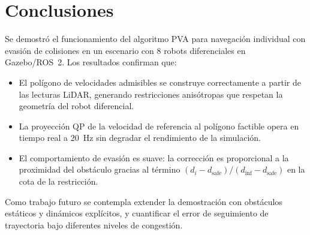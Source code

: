 \section{Conclusiones}

Se demostró el funcionamiento del algoritmo PVA para navegación individual con evasión de colisiones en un escenario con 8 robots diferenciales en Gazebo/ROS~2. Los resultados confirman que:

\begin{itemize}
  \item El polígono de velocidades admisibles se construye correctamente a partir de las lecturas LiDAR, generando restricciones anisótropas que respetan la geometría del robot diferencial.
  \item La proyección QP de la velocidad de referencia al polígono factible opera en tiempo real a 20~Hz sin degradar el rendimiento de la simulación.
  \item El comportamiento de evasión es suave: la corrección es proporcional a la proximidad del obstáculo gracias al término $(d_i - d_{\text{safe}})/(d_{\text{inf}} - d_{\text{safe}})$ en la cota de la restricción.
\end{itemize}

Como trabajo futuro se contempla extender la demostración con obstáculos estáticos y dinámicos explícitos, y cuantificar el error de seguimiento de trayectoria bajo diferentes niveles de congestión.
